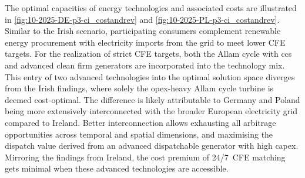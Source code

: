 The optimal capacities of energy technologies and associated costs are illustrated in \cref{fig:10-2025-DE-p3-ci_costandrev} and \cref{fig:10-2025-PL-p3-ci_costandrev}.
Similar to the Irish scenario, participating consumers complement renewable energy procurement with electricity imports from the grid to meet lower CFE targets. 
For the realization of strict CFE targets, both the Allam cycle with \gls{ccs} and advanced clean firm generators are incorporated into the technology mix. 
This entry of two advanced technologies into the optimal solution space diverges from the Irish findings, where solely the \gls{opex}-heavy Allam cycle turbine is deemed cost-optimal. 
The difference is likely attributable to Germany and Poland being more extensively interconnected with the broader European electricity grid compared to Ireland. 
Better interconnection allows exhausting all arbitrage opportunities across temporal and spatial dimensions, and maximising the dispatch value derived from an advanced dispatchable generator with high \gls{capex}.
Mirroring the findings from Ireland, the cost premium of 24/7~CFE matching gets minimal when these advanced technologies are accessible.

